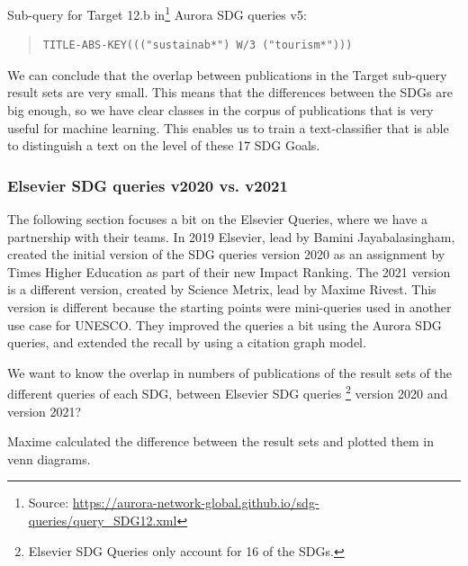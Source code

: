 \documentclass{article}
\begin{document}
Sub-query for Target 12.b in\footnote{ Source: \url{https://aurora-network-global.github.io/sdg-queries/query_SDG12.xml}} Aurora SDG queries v5:
\begin{quote}
\begin{verbatim}
TITLE-ABS-KEY((("sustainab*") W/3 ("tourism*")))
\end{verbatim}
\end{quote}

We can conclude that the overlap between publications in the Target sub-query result sets are very small. This means that the differences between the SDGs are big enough, so we have clear classes in the corpus of publications that is very useful for machine learning. This enables us to train a text-classifier that is able to distinguish a text on the level of these 17 SDG Goals.


\subsubsection{Elsevier SDG queries v2020 vs. v2021}
The following section focuses a bit on the Elsevier Queries, where we have a partnership with their teams. In 2019 Elsevier, lead by Bamini Jayabalasingham, created the initial version of the SDG queries version 2020 as an assignment by Times Higher Education as part of their new Impact Ranking. \cite{jayabalasingham_identifying_2019}
The 2021 version is a different version, created by Science Metrix, lead by Maxime Rivest. \cite{rivest_improving_2021} This version is different because the starting points were mini-queries used in another use case for UNESCO. They improved the queries a bit using the Aurora SDG queries, and extended the recall by using a citation graph model.

We want to know the overlap in numbers of publications of the result sets of the different queries of each SDG, between Elsevier SDG queries \footnote{Elsevier SDG Queries only account for 16 of the SDGs. } version 2020 and version 2021?

Maxime calculated the difference between the result sets and plotted them in venn diagrams.
\end{document}
